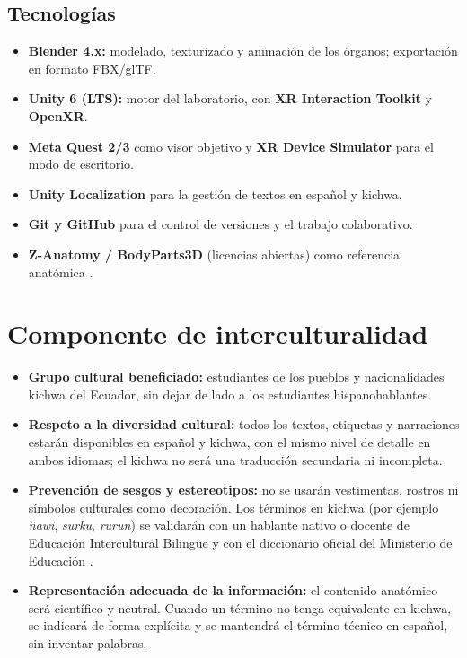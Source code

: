 \documentclass[11pt,a4paper]{article}
\begin{document}
\subsection{Tecnologías}
\begin{itemize}
    \item \textbf{Blender 4.x:} modelado, texturizado y animación de los órganos; exportación en formato FBX/glTF.
    \item \textbf{Unity 6 (LTS):} motor del laboratorio, con \textbf{XR Interaction Toolkit} y \textbf{OpenXR}.
    \item \textbf{Meta Quest 2/3} como visor objetivo y \textbf{XR Device Simulator} para el modo de escritorio.
    \item \textbf{Unity Localization} para la gestión de textos en español y kichwa.
    \item \textbf{Git y GitHub} para el control de versiones y el trabajo colaborativo.
    \item \textbf{Z-Anatomy / BodyParts3D} (licencias abiertas) como referencia anatómica \cite{bodyparts3d}.
\end{itemize}

\section{Componente de interculturalidad}
\begin{itemize}
    \item \textbf{Grupo cultural beneficiado:} estudiantes de los pueblos y nacionalidades kichwa del Ecuador, sin dejar de lado a los estudiantes hispanohablantes.
    \item \textbf{Respeto a la diversidad cultural:} todos los textos, etiquetas y narraciones estarán disponibles en español y kichwa, con el mismo nivel de detalle en ambos idiomas; el kichwa no será una traducción secundaria ni incompleta.
    \item \textbf{Prevención de sesgos y estereotipos:} no se usarán vestimentas, rostros ni símbolos culturales como decoración. Los términos en kichwa (por ejemplo \emph{ñawi}, \emph{surku}, \emph{rurun}) se validarán con un hablante nativo o docente de Educación Intercultural Bilingüe y con el diccionario oficial del Ministerio de Educación \cite{kichwa}.
    \item \textbf{Representación adecuada de la información:} el contenido anatómico será científico y neutral. Cuando un término no tenga equivalente en kichwa, se indicará de forma explícita y se mantendrá el término técnico en español, sin inventar palabras.
\end{itemize}
\end{document}

